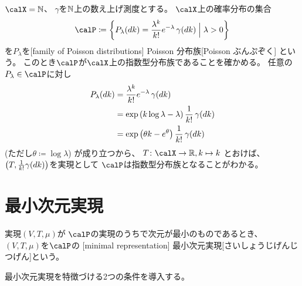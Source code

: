 \documentclass[report]{jlreq}
\begin{document}
\begin{example}
    $\calX = \N$、
    $\gamma$を$\mathbb{N}$上の数え上げ測度とする。
    $\calX$上の確率分布の集合
    \begin{equation}
        \calP \coloneqq \mybrace{
            P_\lambda(dk)
                = \frac{\lambda^k}{k!} e^{-\lambda} \, \gamma(dk)
            \;\Big|\;
            \lambda > 0
        }
    \end{equation}
    を$P_\lambda$を[family of Poisson distributions]
        {Poisson 分布族}[Poisson ぶんぷぞく]
    という。
    このとき$\calP$が$\calX$上の指数型分布族であることを確かめる。
    任意の$P_\lambda \in \calP$に対し
    \begin{alignat}{1}
        P_\lambda(dk)
            &= \frac{\lambda^k}{k!} e^{-\lambda} \, \gamma(dk) \\
            &= \exp\left({
                k \log\lambda - \lambda
            }\right) \frac{1}{k!} \, \gamma(dk) \\
            &= \exp\left({
                \theta k - e^\theta
            }\right) \frac{1}{k!} \, \gamma(dk)
    \end{alignat}
    (ただし$\theta \coloneqq \log \lambda$)
    が成り立つから、
    $T \colon \calX \to \R, k \mapsto k$
    とおけば、
    $\left({ T, \frac{1}{k!} \gamma(dk) }\right)$を実現として
    $\calP$は指数型分布族となることがわかる。
\end{example}

%
\section{最小次元実現}


\begin{definition}[最小次元実現]
    実現$(V, T, \mu)$が
    $\calP$の実現のうちで次元が最小のものであるとき、
    $(V, T, \mu)$を$\calP$の
    [minimal representation]
        {最小次元実現}[さいしょうじげんじつげん]という。
\end{definition}

最小次元実現を特徴づける2つの条件を導入する。
\end{document}
